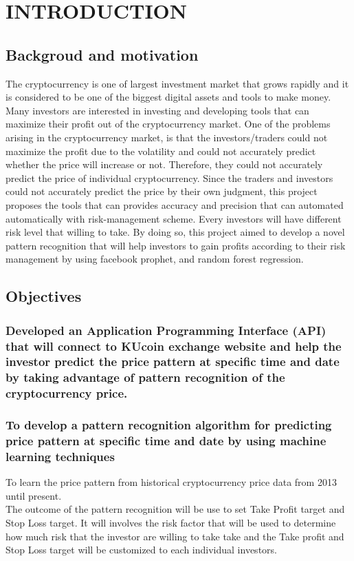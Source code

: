 \chapter{INTRODUCTION}

\section{Backgroud and motivation}
The cryptocurrency is one of largest investment market that grows rapidly and it is considered to be one of the biggest digital assets and tools to make money. Many investors are interested in investing and developing tools that can maximize their profit out of the cryptocurrency market. One of the problems arising in the cryptocurrency market, is that the investors/traders could not maximize the profit due to the volatility and could not accurately predict whether the price will increase or not. Therefore, they could not accurately predict the price of individual cryptocurrency. Since the traders and investors could not accurately predict the price by their own judgment, this project proposes the tools that can provides accuracy and precision that can automated automatically with risk-management scheme. Every investors will have different risk level that willing to take. By doing so, this project aimed to develop a novel pattern recognition that will help investors to gain profits according to their risk management by using facebook prophet, and random forest regression. 
\section{Objectives}

\subsection{Developed an Application Programming Interface (API) that will connect to KUcoin exchange website and help the investor predict the price pattern at specific time and date by taking advantage of pattern recognition of the cryptocurrency price.}
\subsection{To develop a pattern recognition algorithm for predicting price pattern at specific time and date by using machine learning techniques}
To learn the price pattern from historical cryptocurrency price data from 2013 until present. \\
The outcome of the pattern recognition will be use to set Take Profit target and Stop Loss target. It will involves the risk factor that will be used to determine how much risk that the investor are willing to take take and the Take profit and Stop Loss target will be customized to each individual investors.

